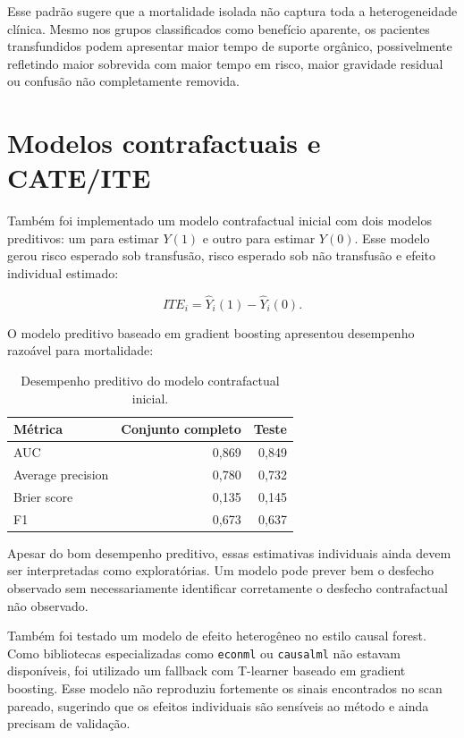 \documentclass[12pt,a4paper]{article}
\begin{document}
Esse padr\~ao sugere que a mortalidade isolada n\~ao captura toda a heterogeneidade cl\'inica. Mesmo nos grupos classificados como benef\'icio aparente, os pacientes transfundidos podem apresentar maior tempo de suporte org\^anico, possivelmente refletindo maior sobrevida com maior tempo em risco, maior gravidade residual ou confus\~ao n\~ao completamente removida.

\section{Modelos contrafactuais e CATE/ITE}

Tamb\'em foi implementado um modelo contrafactual inicial com dois modelos preditivos: um para estimar $Y(1)$ e outro para estimar $Y(0)$. Esse modelo gerou risco esperado sob transfus\~ao, risco esperado sob n\~ao transfus\~ao e efeito individual estimado:

\[
ITE_i = \hat{Y}_i(1) - \hat{Y}_i(0).
\]

O modelo preditivo baseado em gradient boosting apresentou desempenho razo\'avel para mortalidade:

\begin{table}[ht]
\centering
\caption{Desempenho preditivo do modelo contrafactual inicial.}
\begin{tabular}{lrr}
\toprule
M\'etrica & Conjunto completo & Teste \\
\midrule
AUC & 0,869 & 0,849 \\
Average precision & 0,780 & 0,732 \\
Brier score & 0,135 & 0,145 \\
F1 & 0,673 & 0,637 \\
\bottomrule
\end{tabular}
\end{table}

Apesar do bom desempenho preditivo, essas estimativas individuais ainda devem ser interpretadas como explorat\'orias. Um modelo pode prever bem o desfecho observado sem necessariamente identificar corretamente o desfecho contrafactual n\~ao observado.

Tamb\'em foi testado um modelo de efeito heterog\^eneo no estilo causal forest. Como bibliotecas especializadas como \texttt{econml} ou \texttt{causalml} n\~ao estavam dispon\'iveis, foi utilizado um fallback com T-learner baseado em gradient boosting. Esse modelo n\~ao reproduziu fortemente os sinais encontrados no scan pareado, sugerindo que os efeitos individuais s\~ao sens\'iveis ao m\'etodo e ainda precisam de valida\c{c}\~ao.
\end{document}
